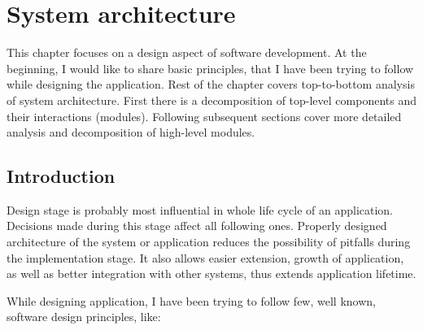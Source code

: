 %


\chapter{System architecture}
\label{cha:sys_arch}

\parbox{0.8\textwidth}{

{\small
This chapter focuses on a design aspect of software development. At the beginning, I would like to share basic principles, that I have been trying to follow while designing the application. Rest of the chapter covers top-to-bottom analysis of system architecture. First there is a decomposition of top-level components and their interactions (modules). Following subsequent sections cover more detailed analysis and decomposition of high-level modules.
}
}

\section{Introduction}
\label{sec:gui}

Design stage is probably most influential in whole life cycle of an application. Decisions made during this stage affect all following ones. Properly designed architecture of the system or application reduces the possibility of pitfalls during the implementation stage. It also allows easier extension, growth of application, as well as better integration with other systems, thus extends application lifetime.

While designing application, I have been trying to follow few, well known, software design principles, like:

